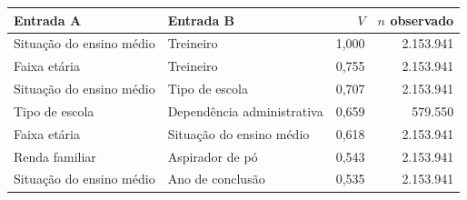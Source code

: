 \begin{tabularx}{\linewidth}{@{}XXrr@{}}\toprule Entrada A & Entrada B & $V$ & $n$ observado\\\midrule
Situação do ensino médio & Treineiro & 1,000 & 2.153.941 \\
Faixa etária & Treineiro & 0,755 & 2.153.941 \\
Situação do ensino médio & Tipo de escola & 0,707 & 2.153.941 \\
Tipo de escola & Dependência administrativa & 0,659 & 579.550 \\
Faixa etária & Situação do ensino médio & 0,618 & 2.153.941 \\
Renda familiar & Aspirador de pó & 0,543 & 2.153.941 \\
Situação do ensino médio & Ano de conclusão & 0,535 & 2.153.941 \\\bottomrule\end{tabularx}